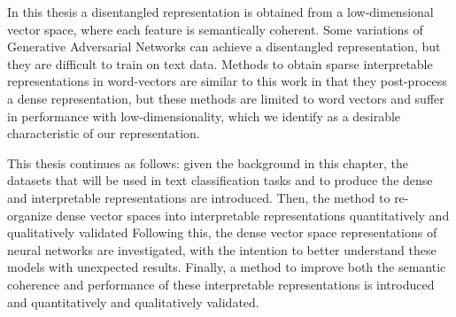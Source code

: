 {In this thesis a  disentangled representation is obtained from a low-dimensional vector space, where each feature is semantically coherent. Some variations of Generative Adversarial Networks can achieve a disentangled representation, but they are difficult to train on text data. Methods to obtain sparse interpretable representations in word-vectors are similar to this work in that they post-process a dense representation, but these methods are limited to word vectors and suffer in performance with low-dimensionality, which we identify as a desirable characteristic of our representation. 

This thesis continues as follows: given the background in this chapter, the datasets that will be used in text classification tasks and to produce the dense and interpretable representations are introduced. Then, the method to re-organize dense vector spaces into interpretable representations  quantitatively and qualitatively validated Following this, the dense vector space representations of neural networks are investigated, with the intention to better understand these models with unexpected results. Finally, a method to improve both the semantic coherence and performance of these  interpretable representations  is introduced and quantitatively and qualitatively validated. 














}
